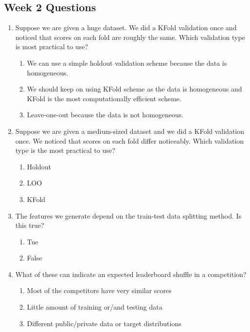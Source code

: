 \documentclass[11pt, twoside]{article}   	%
\begin{document}
\subsection{Week 2 Questions }
\renewcommand{\labelenumii}{\Alph{enumii}}
\begin{enumerate}
  \item Suppose we are given a huge dataset. We did a KFold validation once and noticed that scores on each fold are roughly the same. Which validation type is most practical to use?
    \begin{enumerate}
      \item We can use a simple holdout validation scheme because the data is homogeneous.
      \item We should keep on using KFold scheme as the data is homogeneous and KFold is the most computationally efficient scheme.
      \item Leave-one-out because the data is not homogeneous.
    \end{enumerate}
 
  \item Suppose we are given a medium-sized dataset and we did a KFold validation once. We noticed that scores on each fold differ noticeably. Which validation type is the most practical to use?
    \begin{enumerate}
      \item Holdout
      \item LOO
      \item KFold
    \end{enumerate}

  \item The features we generate depend on the train-test data splitting method. Is this true?
    \begin{enumerate}
      \item Tue
      \item False
    \end{enumerate}
        

  \item What of these can indicate an expected leaderboard shuffle in a competition?    \begin{enumerate}
      \item Most of the competitors have very similar scores
      \item Little amount of training or/and testing data
      \item Different public/private data or target distributions
    \end{enumerate}
    
  \end{enumerate}
  
\end{document}
